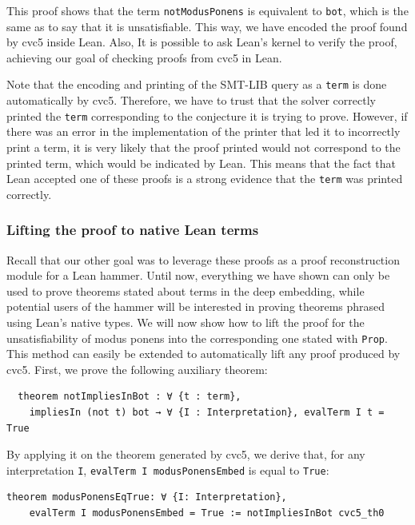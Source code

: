 This proof shows that the term \texttt{notModusPonens} is equivalent to \texttt{bot}, which is
the same as to say that it is unsatisfiable. This way, we have encoded the proof found by cvc5
inside Lean. Also, It is possible to ask Lean's kernel to verify the proof, achieving our
goal of checking proofs from cvc5 in Lean.

Note that the encoding and printing of the SMT-LIB query as a \texttt{term} is done automatically by cvc5.
Therefore, we have to trust
that the solver correctly printed the \texttt{term} corresponding to
the conjecture it is trying to prove. However, if there was an error
in the implementation of the printer that led it to incorrectly
print a term, it is very likely that the proof printed would not
correspond to the printed term, which would be indicated by Lean.
This means that the fact that Lean accepted
one of these proofs is a strong evidence that the \texttt{term} was printed
correctly.

\subsubsection{Lifting the proof to native Lean terms}

Recall that our other goal was to leverage these proofs as a proof reconstruction
module for a Lean hammer. Until now, everything we have shown can only be used
to prove theorems stated about terms in the deep embedding, while potential users
of the hammer will be interested in proving theorems phrased using Lean's native types.
We will now show how to lift the proof for the unsatisfiability of modus ponens into the
corresponding one stated with \texttt{Prop}. This method can easily be extended to
automatically lift any proof produced by cvc5. First, we prove the following
auxiliary theorem:

\begin{verbatim}
  theorem notImpliesInBot : ∀ {t : term},
    impliesIn (not t) bot → ∀ {I : Interpretation}, evalTerm I t = True
\end{verbatim}

By applying it on the theorem generated by cvc5, we derive that, for any
interpretation \texttt{I}, \texttt{evalTerm I modusPonensEmbed} is equal
to \texttt{True}:

\begin{verbatim}
theorem modusPonensEqTrue: ∀ {I: Interpretation},
    evalTerm I modusPonensEmbed = True := notImpliesInBot cvc5_th0
\end{verbatim}

